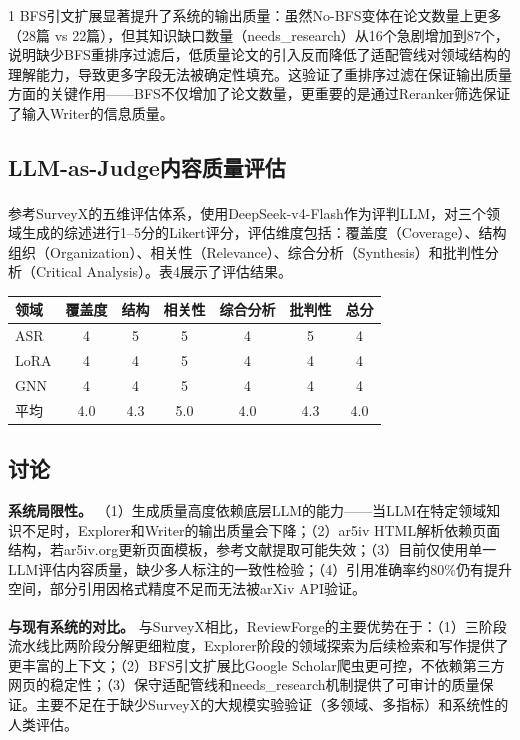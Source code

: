 \documentclass[10.5pt,compsoc,UTF8]{CjC}
\theoremstyle{mystyle}
\newcommand{\upcite}[1]{\textsuperscript{\cite{#1}}}
\begin{document}
\begin{multicols}{1}
BFS引文扩展显著提升了系统的输出质量：虽然No-BFS变体在论文数量上更多（28篇 vs 22篇），但其知识缺口数量（needs\_research）从16个急剧增加到87个，说明缺少BFS重排序过滤后，低质量论文的引入反而降低了适配管线对领域结构的理解能力，导致更多字段无法被确定性填充。这验证了重排序过滤在保证输出质量方面的关键作用——BFS不仅增加了论文数量，更重要的是通过Reranker筛选保证了输入Writer的信息质量。

\subsection{LLM-as-Judge内容质量评估}

参考SurveyX\upcite{surveyx2025}的五维评估体系，使用DeepSeek-v4-Flash作为评判LLM，对三个领域生成的综述进行1--5分的Likert评分，评估维度包括：覆盖度（Coverage）、结构组织（Organization）、相关性（Relevance）、综合分析（Synthesis）和批判性分析（Critical Analysis）。表4展示了评估结果。

\begin{table}[htbp]
\vspace {-2.5mm}
\begin{center}
\begin{tabular}{lccccc|c}
\toprule
\textbf{领域} & \textbf{覆盖度} & \textbf{结构} & \textbf{相关性} & \textbf{综合分析} & \textbf{批判性} & \textbf{总分} \\
\hline
ASR & 4 & 5 & 5 & 4 & 5 & 4 \\
LoRA & 4 & 4 & 5 & 4 & 4 & 4 \\
GNN & 4 & 4 & 5 & 4 & 4 & 4 \\
\hline
平均 & 4.0 & 4.3 & 5.0 & 4.0 & 4.3 & 4.0 \\
\bottomrule
\end{tabular}
\label{tab:content}
\end{center}
\end{table}

\subsection{讨论}

\textbf{系统局限性。} （1）生成质量高度依赖底层LLM的能力——当LLM在特定领域知识不足时，Explorer和Writer的输出质量会下降；（2）ar5iv HTML解析依赖页面结构，若ar5iv.org更新页面模板，参考文献提取可能失效；（3）目前仅使用单一LLM评估内容质量，缺少多人标注的一致性检验；（4）引用准确率约80\%仍有提升空间，部分引用因格式精度不足而无法被arXiv API验证。

\textbf{与现有系统的对比。} 与SurveyX\upcite{surveyx2025}相比，ReviewForge的主要优势在于：（1）三阶段流水线比两阶段分解更细粒度，Explorer阶段的领域探索为后续检索和写作提供了更丰富的上下文；（2）BFS引文扩展比Google Scholar爬虫更可控，不依赖第三方网页的稳定性；（3）保守适配管线和needs\_research机制提供了可审计的质量保证。主要不足在于缺少SurveyX的大规模实验验证（多领域、多指标）和系统性的人类评估。


\end{multicols}
\end{document}
